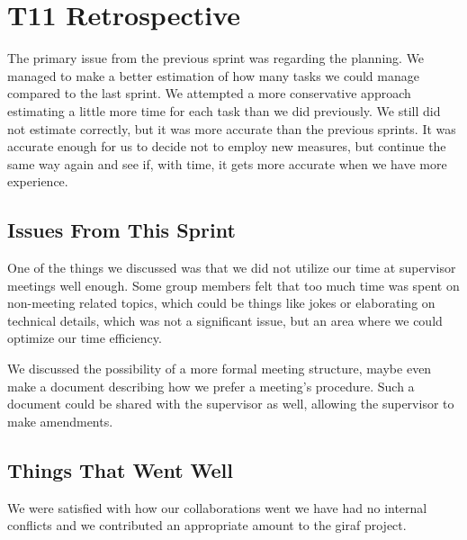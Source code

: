 \section{T11 Retrospective}

The primary issue from the previous sprint was regarding the planning. We managed to make a better estimation of how many tasks we could manage compared to the last sprint. We attempted a more conservative approach estimating a little more time for each task than we did previously. We still did not estimate correctly, but it was more accurate than the previous sprints. It was accurate enough for us to decide not to employ new measures, but continue the same way again and see if, with time, it gets more accurate when we have more experience.

\subsection{Issues From This Sprint}

One of the things we discussed was that we did not utilize our time at supervisor meetings well enough. Some group members felt that too much time was spent on non-meeting related topics, which could be things like jokes or elaborating on technical details, which was not a significant issue, but an area where we could optimize our time efficiency.

We discussed the possibility of a more formal meeting structure, maybe even make a document describing how we prefer a meeting's procedure. Such a document could be shared with the supervisor as well, allowing the supervisor to make amendments.

\subsection{Things That Went Well}

We were satisfied with how our collaborations went we have had no internal conflicts and we contributed an appropriate amount to the \gls{giraf} project. 
